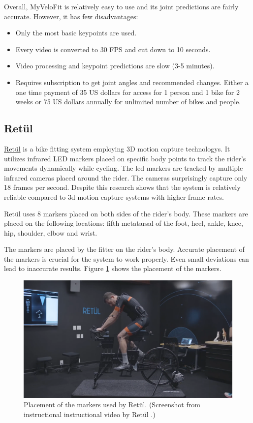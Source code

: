 Overall, MyVeloFit is relatively easy to use and its joint predictions are fairly accurate. However, it has few disadvantages:

\begin{itemize}
    \item Only the most basic keypoints are used.
    \item Every video is converted to 30 FPS and cut down to 10 seconds.
    \item Video processing and keypoint predictions are slow (3-5 minutes).
    \item Requires subscription to get joint angles and recommended changes. Either a one time payment of 35 US dollars for access for 1 person and 1 bike for 2 weeks or 75 US dollars annually for unlimited number of bikes and people.
\end{itemize}


\subsection{Retül}
\href{https://www.retul.com/}{Retül} is a bike fitting system employing 3D motion capture technologys. It utilizes infrared LED markers placed on specific body points to track the rider's movements dynamically while cycling. The led markers are tracked by multiple infrared cameras placed around the rider. The cameras surprisingly capture only 18 frames per second. Despite this research \cite{retulReliability} shows that the system is relatively reliable compared to 3d motion capture systems with higher frame rates.

Retül uses 8 markers placed on both sides of the rider's body. These markers are placed on the following locations: fifth metatarsal of the foot, heel, ankle, knee, hip, shoulder, elbow and wrist.


The markers are placed by the fitter on the rider's body. Accurate placement of the markers is crucial for the system to work properly. Even small deviations can lead to inaccurate results. Figure \ref{fig:retul_markers} shows the placement of the markers.

\begin{figure}[htbp]
    \centering
    \includegraphics[width=\textwidth]{obrazky-figures/retul_markers.png}
    \caption{Placement of the markers used by Retül. (Screenshot from instructional instructional video by Retül \cite{retulMarkersYoutube}.)}
    \label{fig:retul_markers}
\end{figure}


